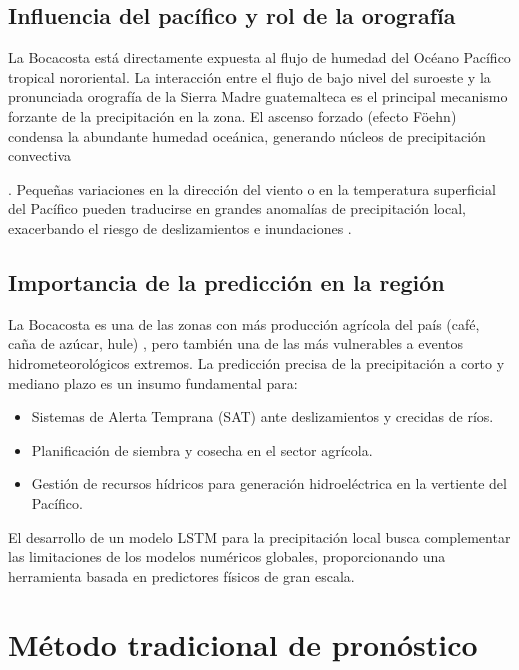 \subsection{Influencia del pacífico y rol de la orografía}
La Bocacosta está directamente expuesta al flujo de humedad del Océano Pacífico tropical nororiental. La interacción entre el flujo de bajo nivel del suroeste y la pronunciada orografía de la Sierra Madre guatemalteca es el principal mecanismo forzante de la precipitación en la zona. El ascenso forzado (efecto Föehn) condensa la abundante humedad oceánica, generando núcleos de precipitación convectiva . Pequeñas variaciones en la dirección del viento o en la temperatura superficial del Pacífico pueden traducirse en grandes anomalías de precipitación local, exacerbando el riesgo de deslizamientos e inundaciones \citep{herrera2017descripcion, ramos2022influencia, avalosanalisis}.

\subsection{Importancia de la predicción en la región}
La Bocacosta es una de las zonas con más producción agrícola del país (café, caña de azúcar, hule) \citep{acosta2005contribucion, morales2007acceso}, pero también una de las más vulnerables a eventos hidrometeorológicos extremos. La predicción precisa de la precipitación a corto y mediano plazo es un insumo fundamental para:
\begin{itemize}
    \item Sistemas de Alerta Temprana (SAT) ante deslizamientos y crecidas de ríos.
    \item Planificación de siembra y cosecha en el sector agrícola.
    \item Gestión de recursos hídricos para generación hidroeléctrica en la vertiente del Pacífico.
\end{itemize}
El desarrollo de un modelo LSTM para la precipitación local busca complementar las limitaciones de los modelos numéricos globales, proporcionando una herramienta basada en predictores físicos de gran escala.

\section{Método tradicional de pronóstico}

